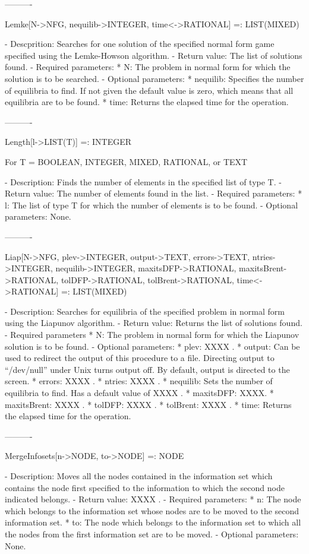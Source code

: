 ----------

Lemke[N->NFG, {nequilib->INTEGER}, {time<->RATIONAL}] =: LIST(MIXED)

   -	Descprition:  Searches for one solution of the specified normal form 
	game specified using the Lemke-Howson algorithm.  
   -	Return value:  The list of solutions found.
   -	Required parameters:
	  *  N:  The problem in normal form for which the solution is to be 
		searched.
   -	Optional parameters: 
	  *  nequilib:  Specifies the number of equilibria to find.  If not
		given the default value is zero, which means that all 
		equilibria are to be found.
	  *  time:  Returns the elapsed time for the operation.

----------

Length[l->LIST(T)] =: INTEGER

	For T = BOOLEAN, INTEGER, MIXED, RATIONAL, or TEXT

   -	Description:  Finds the number of elements in the specified list of 
	type T.
   -	Return value:  The number of elements found in the list.
   -	Required parameters:
	  *  l:  The list of type T for which the number of elements is to be 
		found.
   -	Optional parameters:  None.

----------

Liap[N->NFG, {plev->INTEGER}, {output->TEXT}, {errors->TEXT}, 
	{ntries->INTEGER}, {nequilib->INTEGER}, {maxitsDFP->RATIONAL},
	{maxitsBrent->RATIONAL}, {tolDFP->RATIONAL}, {tolBrent->RATIONAL},
	{time<->RATIONAL}] =: LIST(MIXED)

   -	Description:  Searches for equilibria of the specified problem in 
	normal form using the Liapunov algorithm.
   -	Return value:  Returns the list of solutions found.
   -	Required parameters
	  *  N:  The problem in normal form for which the Liapunov solution is 
		to be found.
   -	Optional parameters:
	  *  plev: XXXX .
	  *  output:  Can be used to redirect the output of this procedure to a
		file.  Directing output to ``/dev/null'' under Unix turns 
		output off.  By default, output is directed to the screen.
	  *  errors:  XXXX .
	  *  ntries:  XXXX .
	  *  nequilib:  Sets the number of equilibria to find.  Has a default 
		value of XXXX . 
	  *  maxitsDFP:  XXXX.
	  *  maxitsBrent:  XXXX .
	  *  tolDFP:  XXXX . 
	  *  tolBrent:  XXXX .
	  *  time:  Returns the elapsed time for the operation.

----------

MergeInfosets[n->NODE, to->NODE] =: NODE

   -	Description:  Moves all the nodes contained in the information set 
	which contains the node first specified to the information to which the
	second node indicated belongs.
   -	Return value:  XXXX .
   -	Required parameters:
	  *  n:  The node which belongs to the information set whose nodes are
		to be moved to the second information set.
	  *  to:  The node which belongs to the information set to which all
		the nodes from the first information set are to be moved.
   -	Optional parameters:  None.

